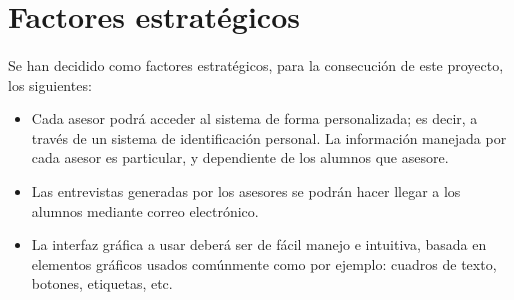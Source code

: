 \section{Factores estratégicos}

\paragraph{}Se han decidido como factores estratégicos, para la consecución de
este proyecto, los siguientes:

\begin{itemize}
   \item Cada asesor podrá acceder al sistema de forma personalizada; es decir,
   a través de un sistema de identificación personal. La información manejada
   por cada asesor es particular, y dependiente de los alumnos que asesore.
   \item Las entrevistas generadas por los asesores se podrán hacer llegar a los
   alumnos mediante correo electrónico.
   \item La interfaz gráfica a usar deberá ser de fácil manejo e intuitiva,
   basada en elementos gráficos usados comúnmente como por ejemplo: cuadros de
   texto, botones, etiquetas, etc.
\end{itemize}

